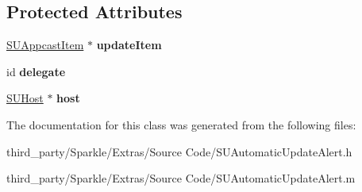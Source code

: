 \subsection*{Protected Attributes}
\begin{DoxyCompactItemize}
\item 
\mbox{\label{interface_s_u_automatic_update_alert_a00a2dd334243fd3e7d291036a080d8a0}} 
\mbox{\hyperlink{interface_s_u_appcast_item}{S\+U\+Appcast\+Item}} $\ast$ {\bfseries update\+Item}
\item 
\mbox{\label{interface_s_u_automatic_update_alert_a4f16a3f212baccdcc620be4d6284315a}} 
id {\bfseries delegate}
\item 
\mbox{\label{interface_s_u_automatic_update_alert_a174f4e86c53916af04819eddd6b3c01a}} 
\mbox{\hyperlink{interface_s_u_host}{S\+U\+Host}} $\ast$ {\bfseries host}
\end{DoxyCompactItemize}


The documentation for this class was generated from the following files\+:\begin{DoxyCompactItemize}
\item 
third\+\_\+party/\+Sparkle/\+Extras/\+Source Code/S\+U\+Automatic\+Update\+Alert.\+h\item 
third\+\_\+party/\+Sparkle/\+Extras/\+Source Code/S\+U\+Automatic\+Update\+Alert.\+m\end{DoxyCompactItemize}
